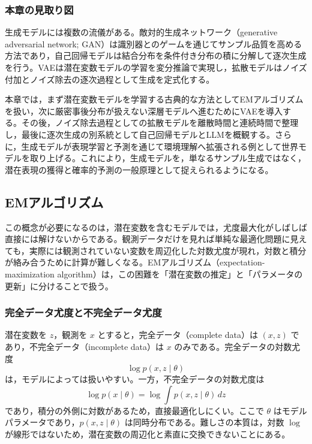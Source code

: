 \subsubsection{本章の見取り図}

生成モデルには複数の流儀がある。敵対的生成ネットワーク（generative adversarial network; GAN）は識別器とのゲームを通じてサンプル品質を高める方法であり，自己回帰モデルは結合分布を条件付き分布の積に分解して逐次生成を行う。VAEは潜在変数モデルの学習を変分推論で実現し，拡散モデルはノイズ付加とノイズ除去の逐次過程として生成を定式化する。

本章では，まず潜在変数モデルを学習する古典的な方法としてEMアルゴリズムを扱い，次に厳密事後分布が扱えない深層モデルへ進むためにVAEを導入する。その後，ノイズ除去過程としての拡散モデルを離散時間と連続時間で整理し，最後に逐次生成の別系統として自己回帰モデルとLLMを概観する。さらに，生成モデルが表現学習と予測を通じて環境理解へ拡張される例として世界モデルを取り上げる。これにより，生成モデルを，単なるサンプル生成ではなく，潜在表現の獲得と確率的予測の一般原理として捉えられるようになる。

\subsection{EMアルゴリズム}

この概念が必要になるのは，潜在変数を含むモデルでは，尤度最大化がしばしば直接には解けないからである。観測データだけを見れば単純な最適化問題に見えても，実際には観測されていない変数を周辺化した対数尤度が現れ，対数と積分が絡み合うために計算が難しくなる。EMアルゴリズム（expectation-maximization algorithm）は，この困難を「潜在変数の推定」と「パラメータの更新」に分けることで扱う。

\subsubsection{完全データ尤度と不完全データ尤度}

潜在変数を \(z\)，観測を \(x\) とすると，完全データ（complete data）は \((x,z)\) であり，不完全データ（incomplete data）は \(x\) のみである。完全データの対数尤度
\begin{equation}
\log p(x,z \mid \theta)
\end{equation}
は，モデルによっては扱いやすい。一方，不完全データの対数尤度は
\begin{equation}
\log p(x \mid \theta) = \log \int p(x,z \mid \theta)\, dz
\end{equation}
であり，積分の外側に対数があるため，直接最適化しにくい。ここで \(\theta\) はモデルパラメータであり，\(p(x,z \mid \theta)\) は同時分布である。難しさの本質は，対数 \(\log\) が線形ではないため，潜在変数の周辺化と素直に交換できないことにある。

